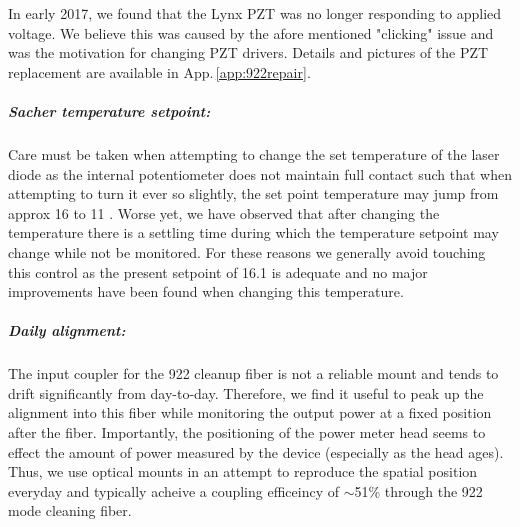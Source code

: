 In early 2017, we found that the Lynx PZT was no longer responding to applied voltage.
We believe this was caused by the afore mentioned "clicking" issue and was the motivation for changing PZT drivers.
Details and pictures of the PZT replacement are available in App.\,\ref{app:922repair}.

\subparagraph{Sacher temperature setpoint:}
Care must be taken when attempting to change the set temperature of the laser diode as the internal potentiometer does not maintain full contact such that when attempting to turn it ever so slightly, the set point temperature may jump from approx 16 \degreeC to 11 \degreeC.
Worse yet, we have observed that after changing the temperature there is a settling time during which the temperature setpoint may change while not be monitored.
For these reasons we generally avoid touching this control as the present setpoint of 16.1 \degreeC is adequate and no major improvements have been found when changing this temperature.

\subparagraph{Daily alignment:}
The input coupler for the 922 cleanup fiber is not a reliable mount and tends to drift significantly from day-to-day.
Therefore, we find it useful to peak up the alignment into this fiber while monitoring the output power at a fixed position after the fiber.
Importantly, the positioning of the power meter head seems to effect the amount of power measured by the device (especially as the head ages).
Thus, we use optical mounts in an attempt to reproduce the spatial position everyday and typically acheive a coupling efficeincy of $\sim$51\% through the 922 mode cleaning fiber.
		
